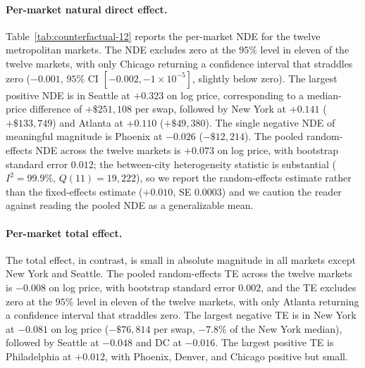 \paragraph{Per-market natural direct effect.}
Table~\ref{tab:counterfactual-12} reports the per-market NDE for the
twelve metropolitan markets. The NDE excludes zero at the $95\%$
level in eleven of the twelve markets, with only Chicago returning a
confidence interval that straddles zero ($-0.001$, $95\%$ CI
$[-0.002, -1{\times}10^{-5}]$, slightly below zero). The largest
positive NDE is in Seattle at $+0.323$ on log price, corresponding to
a median-price difference of $+\$251{,}108$ per swap, followed by New
York at $+0.141$ ($+\$133{,}749$) and Atlanta at $+0.110$
($+\$49{,}380$). The single negative NDE of meaningful magnitude is
Phoenix at $-0.026$ ($-\$12{,}214$). The pooled random-effects NDE
across the twelve markets is $+0.073$ on log price, with bootstrap
standard error $0.012$; the between-city heterogeneity statistic is
substantial ($I^2 = 99.9\%$, $Q(11) = 19{,}222$), so we report the
random-effects estimate rather than the fixed-effects estimate
($+0.010$, SE $0.0003$) and we caution the reader against reading
the pooled NDE as a generalizable mean.

\paragraph{Per-market total effect.} The total effect, in contrast,
is small in absolute magnitude in all markets except New York and
Seattle. The pooled random-effects TE across the twelve markets is
$-0.008$ on log price, with bootstrap standard error $0.002$, and the
TE excludes zero at the $95\%$ level in eleven of the twelve markets,
with only Atlanta returning a confidence interval that straddles zero.
The largest negative TE is in New York at $-0.081$ on log price
($-\$76{,}814$ per swap, $-7.8\%$ of the New York median), followed
by Seattle at $-0.048$ and DC at $-0.016$. The largest positive TE
is Philadelphia at $+0.012$, with Phoenix, Denver, and Chicago
positive but small.

